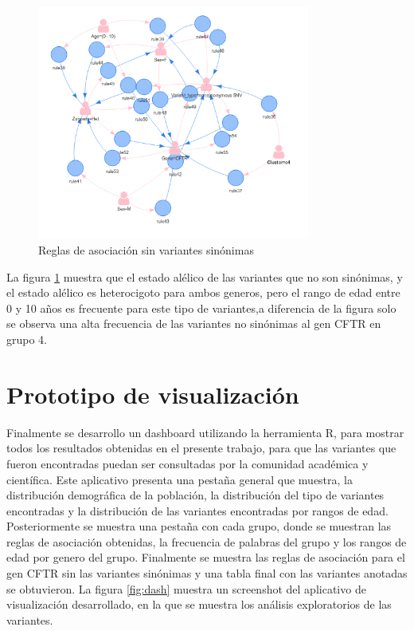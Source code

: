 \begin{figure}[H]
	\centering
	\includegraphics[width=0.8\textwidth]{Kap4/CFTR2}
	\caption{Reglas de asociación sin variantes sinónimas} \label{fig:re6}
\end{figure}

La figura \ref{fig:re6} muestra que el estado alélico de las variantes que no son sinónimas, y el estado alélico es heterocigoto para ambos generos, pero el rango de edad entre 0 y 10 años es frecuente para este tipo de variantes,a diferencia de la figura \label{fig:r6} solo se observa una alta frecuencia de las variantes no sinónimas al gen CFTR en grupo 4.  

\section{Prototipo de visualización}

Finalmente se desarrollo un dashboard utilizando la herramienta R, para mostrar todos los resultados obtenidas en el presente trabajo, para que las variantes que fueron encontradas puedan ser consultadas por la comunidad académica y científica. Este aplicativo presenta una pestaña general que muestra, la distribución demográfica de la población, la distribución del tipo de variantes encontradas y la distribución de las variantes encontradas por rangos de edad. Posteriormente se muestra una pestaña con cada grupo, donde se muestran las reglas de asociación obtenidas, la frecuencia de palabras del grupo y los rangos de edad por genero del grupo. Finalmente se muestra las reglas de asociación para el gen CFTR sin las variantes sinónimas y una tabla final con las variantes anotadas se obtuvieron. La figura \ref{fig:dash} muestra un screenshot  del aplicativo de visualización desarrollado, en la que se muestra los análisis exploratorios de las variantes.

